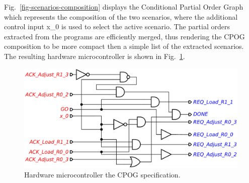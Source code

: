 Fig.~\ref{fig-scenarios-composition} displays the Conditional Partial
Order Graph which represents the composition of the two scenarios, where the
additional control input \textsf{x\_0} is used to select the active scenario.
The partial orders extracted from the programs are efficiently merged, thus
rendering the CPOG composition to be more compact then a simple list of the
extracted scenarios. The resulting hardware microcontroller is shown in
Fig.~\ref{fig-scenarios-circuit}.

\begin{figure}[h]
\vspace{-5mm}
\centerline{\includegraphics[scale=0.4]{img/ataed-circuit.pdf}}
\caption{Hardware microcontroller the CPOG specification.\label{fig-scenarios-circuit}}
\vspace{-7mm}
\end{figure}

